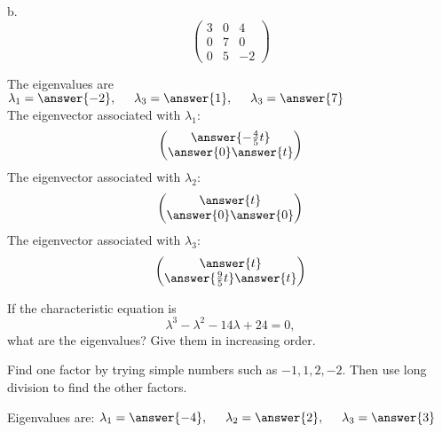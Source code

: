 \documentclass{ximera}
\begin{document}
\begin{exercise}
b. 
\[\begin{pmatrix}
3& 0 & 4\\
0 & 7 & 0\\
0 & 5 & -2
\end{pmatrix}
\]
\begin{prompt}
The eigenvalues are $\lambda_{1}= \answer{-2}, \hspace{.5cm} \lambda_{3}= \answer{1}, \hspace{.5cm} \lambda_{3}= \answer{7}$\\
The eigenvector associated with $\lambda_{1}$:
\[
\begin{pmatrix}
\answer{-\frac{4}{5}t}\\
\answer{0}
\answer{t}
\end{pmatrix}
\]
The eigenvector associated with $\lambda_{2}$:
\[
\begin{pmatrix}
\answer{t}\\
\answer{0}
\answer{0}
\end{pmatrix}
\]
The eigenvector associated with $\lambda_{3}$:
\[
\begin{pmatrix}
\answer{t}\\
\answer{\frac{9}{5}t}
\answer{t}
\end{pmatrix}
\]
\end{prompt}
\end{exercise}

\begin{exercise}
If the characteristic equation is
\begin{equation*}
\lambda^{3}-\lambda^{2} - 14\lambda +24 =0,
\end{equation*}
what are the eigenvalues? Give them in increasing order.
\begin{prompt}
\begin{hint}
Find one factor by trying simple numbers such as $-1, 1, 2, -2$. Then use long division to find the other factors.
\end{hint}
Eigenvalues are: $\lambda_{1} = \answer{-4}, \hspace{.5cm} \lambda_{2}= \answer{2}, \hspace{.5cm} \lambda_{3} = \answer{3}$
\end{prompt}

\end{exercise}
\end{document}
